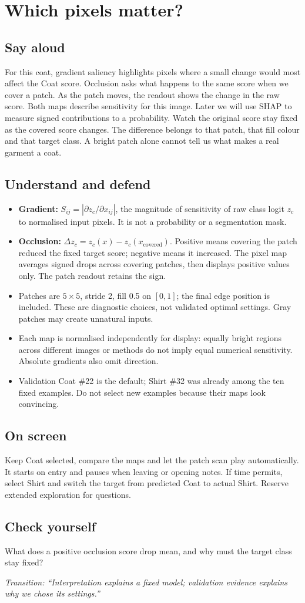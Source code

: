 \documentclass[11pt,a4paper]{article}
\newcommand{\slide}[3]{\clearpage{\small\color{olive}SLIDE #1\hfill Target: #3}\par\section{#2}}
\newcommand{\say}{\subsection{Say aloud}}
\newcommand{\understand}{\subsection{Understand and defend}}
\newcommand{\screen}{\subsection{On screen}}
\newcommand{\selfcheck}[1]{\subsection{Check yourself}#1}
\newcommand{\transition}[1]{\par\smallskip\textit{Transition: #1}}
\newcounter{question}
\begin{document}
\slide{8}{Which pixels matter?}{40 seconds}
\say
For this coat, gradient saliency highlights pixels where a small change would most affect the Coat score. Occlusion asks what happens to the same score when we cover a patch. As the patch moves, the readout shows the change in the raw score. Both maps describe sensitivity for this image. Later we will use SHAP to measure signed contributions to a probability. Watch the original score stay fixed as the covered score changes. The difference belongs to that patch, that fill colour and that target class. A bright patch alone cannot tell us what makes a real garment a coat.
\understand
\begin{itemize}
\item \textbf{Gradient:} $S_{ij}=\left|\partial z_c/\partial x_{ij}\right|$, the magnitude of sensitivity of raw class logit $z_c$ to normalised input pixels. It is not a probability or a segmentation mask.
\item \textbf{Occlusion:} $\Delta z_c=z_c(x)-z_c(x_{\mathrm{covered}})$. Positive means covering the patch reduced the fixed target score; negative means it increased. The pixel map averages signed drops across covering patches, then displays positive values only. The patch readout retains the sign.
\item Patches are $5\times5$, stride 2, fill 0.5 on $[0,1]$; the final edge position is included. These are diagnostic choices, not validated optimal settings. Gray patches may create unnatural inputs.
\item Each map is normalised independently for display: equally bright regions across different images or methods do not imply equal numerical sensitivity. Absolute gradients also omit direction.
\item Validation Coat \#22 is the default; Shirt \#32 was already among the ten fixed examples. Do not select new examples because their maps look convincing.
\end{itemize}
\screen
Keep Coat selected, compare the maps and let the patch scan play automatically. It starts on entry and pauses when leaving or opening notes. If time permits, select Shirt and switch the target from predicted Coat to actual Shirt. Reserve extended exploration for questions.
\selfcheck{What does a positive occlusion score drop mean, and why must the target class stay fixed?}
\transition{``Interpretation explains a fixed model; validation evidence explains why we chose its settings.''}
\end{document}
